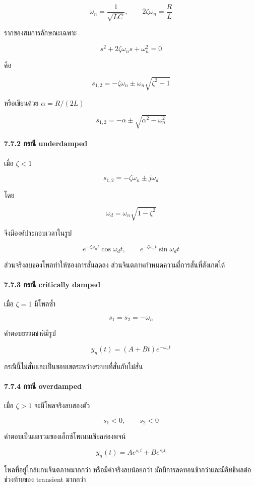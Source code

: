 \[
\omega_n=\frac{1}{\sqrt{LC}},\qquad 2\zeta\omega_n=\frac{R}{L}
\]

รากของสมการลักษณะเฉพาะ

\[
s^2+2\zeta\omega_ns+\omega_n^2=0
\]

คือ

\[
s_{1,2}=-\zeta\omega_n\pm\omega_n\sqrt{\zeta^2-1}
\]

หรือเขียนด้วย $\alpha=R/(2L)$

\[
s_{1,2}=-\alpha\pm\sqrt{\alpha^2-\omega_n^2}
\]

\paragraph{7.7.2 กรณี underdamped}

เมื่อ $\zeta<1$

\[
s_{1,2}=-\zeta\omega_n\pm j\omega_d
\]

โดย

\[
\omega_d=\omega_n\sqrt{1-\zeta^2}
\]

จึงมีองค์ประกอบเวลาในรูป

\[
e^{-\zeta\omega_nt}\cos\omega_dt,\qquad e^{-\zeta\omega_nt}\sin\omega_dt
\]

ส่วนจริงลบของโพลทำให้ซองการสั่นลดลง ส่วนจินตภาพกำหนดความถี่การสั่นที่สังเกตได้

\paragraph{7.7.3 กรณี critically damped}

เมื่อ $\zeta=1$ มีโพลซ้ำ

\[
s_1=s_2=-\omega_n
\]

คำตอบธรรมชาติมีรูป

\[
y_n(t)=(A+Bt)e^{-\omega_nt}
\]

กรณีนี้ไม่สั่นและเป็นขอบเขตระหว่างระบบที่สั่นกับไม่สั่น

\paragraph{7.7.4 กรณี overdamped}

เมื่อ $\zeta>1$ จะมีโพลจริงลบสองตัว

\[
s_1<0,\qquad s_2<0
\]

คำตอบเป็นผลรวมของเอ็กซ์โพเนนเชียลสองพจน์

\[
y_n(t)=A e^{s_1t}+B e^{s_2t}
\]

โพลที่อยู่ใกล้แกนจินตภาพมากกว่า หรือมีค่าจริงลบน้อยกว่า มักมีการลดทอนช้ากว่าและมีอิทธิพลต่อช่วงท้ายของ transient มากกว่า

